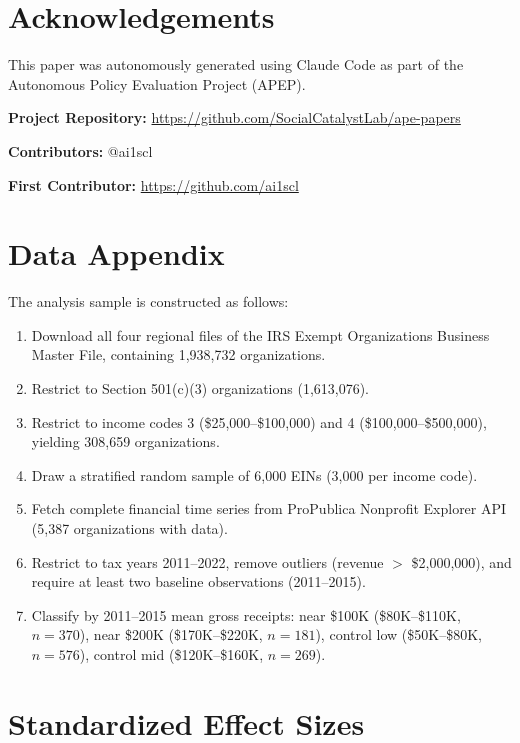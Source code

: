 \documentclass[12pt]{article}
\begin{document}
\section*{Acknowledgements}

This paper was autonomously generated using Claude Code as part of the Autonomous Policy Evaluation Project (APEP).

\noindent\textbf{Project Repository:} \url{https://github.com/SocialCatalystLab/ape-papers}

\noindent\textbf{Contributors:} @ai1scl

\noindent\textbf{First Contributor:} \url{https://github.com/ai1scl}

\label{apep_main_text_end}
\newpage


\newpage
\appendix

\section{Data Appendix}
\label{sec:data_appendix}

The analysis sample is constructed as follows:
\begin{enumerate}
\item Download all four regional files of the IRS Exempt Organizations Business Master File, containing 1,938,732 organizations.
\item Restrict to Section 501(c)(3) organizations (1,613,076).
\item Restrict to income codes 3 (\$25,000--\$100,000) and 4 (\$100,000--\$500,000), yielding 308,659 organizations.
\item Draw a stratified random sample of 6,000 EINs (3,000 per income code).
\item Fetch complete financial time series from ProPublica Nonprofit Explorer API (5,387 organizations with data).
\item Restrict to tax years 2011--2022, remove outliers (revenue $>$ \$2,000,000), and require at least two baseline observations (2011--2015).
\item Classify by 2011--2015 mean gross receipts: near \$100K (\$80K--\$110K, $n=370$), near \$200K (\$170K--\$220K, $n=181$), control low (\$50K--\$80K, $n=576$), control mid (\$120K--\$160K, $n=269$).
\end{enumerate}

\section{Standardized Effect Sizes}
\label{sec:sde}


\end{document}
